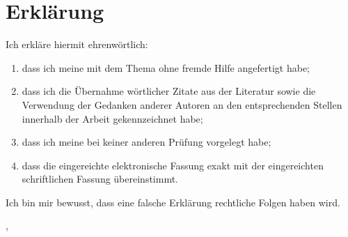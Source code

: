 \thispagestyle{empty}

\section*{Erklärung}
\vspace*{2em}

Ich erkläre hiermit ehrenwörtlich: \\
\begin{enumerate}
\item dass ich meine {\arbeitsart} mit dem Thema
{\itshape \titel } ohne fremde Hilfe angefertigt habe;
\item dass ich die Übernahme wörtlicher Zitate aus der Literatur sowie die Verwendung der Gedanken
anderer Autoren an den entsprechenden Stellen innerhalb der Arbeit gekennzeichnet habe;
\item dass ich meine {\arbeitsart} bei keiner anderen Prüfung vorgelegt habe;
\item dass die eingereichte elektronische Fassung exakt mit der eingereichten schriftlichen Fassung
übereinstimmt.
\end{enumerate}

Ich bin mir bewusst, dass eine falsche Erklärung rechtliche Folgen haben wird.

\vspace{3em}

\abgabeort, \datumAbgabe
\vspace{4em}

\autor
